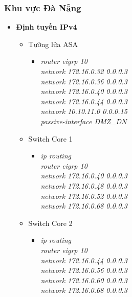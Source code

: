 \documentclass[12pt,a4paper]{report}
\begin{document}
\subsubsection{Khu vực Đà Nẵng}
\begin{itemize}
      \item \textbf{Định tuyến IPv4}
      
      \begin{itemize}
        \item Tường lửa ASA 
        \begin{itemize}
          \item \textit{router eigrp 10\\
network 172.16.0.32 0.0.0.3 \\
network 172.16.0.36 0.0.0.3 \\
network 172.16.0.40 0.0.0.3 \\
network 172.16.0.44 0.0.0.3\\
network 10.10.11.0 0.0.0.15\\
passive-interface DMZ\_DN\\}
        
        \end{itemize}
      
           \item Switch Core 1
        \begin{itemize}
         \item \textit{ip routing\\
router eigrp 10\\
network 172.16.0.40 0.0.0.3 \\
network 172.16.0.48 0.0.0.3 \\
network 172.16.0.52 0.0.0.3 \\
network 172.16.0.68 0.0.0.3 \\}
         
          \end{itemize}
             \item Switch Core 2
        \begin{itemize}
         \item \textit{ip routing\\
router eigrp 10\\
network 172.16.0.44 0.0.0.3 \\
network 172.16.0.56 0.0.0.3 \\
network 172.16.0.60 0.0.0.3 \\
network 172.16.0.68 0.0.0.3 \\}
         

\end{itemize}
\end{itemize}
\end{itemize}
\end{document}
